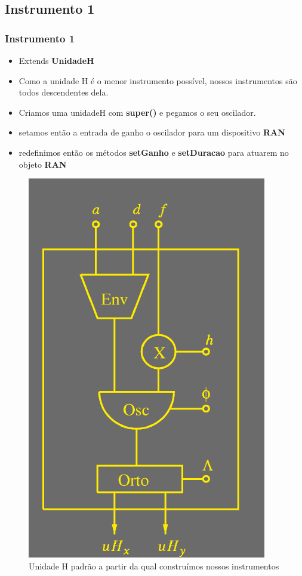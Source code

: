 \documentclass{beamer}
\begin{document}
\subsection{Instrumento 1}
\begin{frame}
 \frametitle{Instrumento 1}
 \begin{itemize}
 \item Extends \textbf{UnidadeH}
 \item Como a unidade H é o menor instrumento possível, nossos instrumentos são todos
 descendentes dela.
 \item Criamos uma unidadeH com \textbf{super()} e pegamos o seu oscilador.
 \item setamos então a entrada de ganho o oscilador para um dispositivo \textbf{RAN}
 \item redefinimos então os métodos \textbf{setGanho} e \textbf{setDuracao} para atuarem no objeto \textbf{RAN}
 \end{itemize}
\end{frame}

\begin{frame}
 \begin{figure}
  \includegraphics[scale=0.3]{./images/unidadeH.png}
  \caption{Unidade H padrão a partir da qual construímos nossos instrumentos}
 \end{figure} 
\end{frame}
\end{document}
